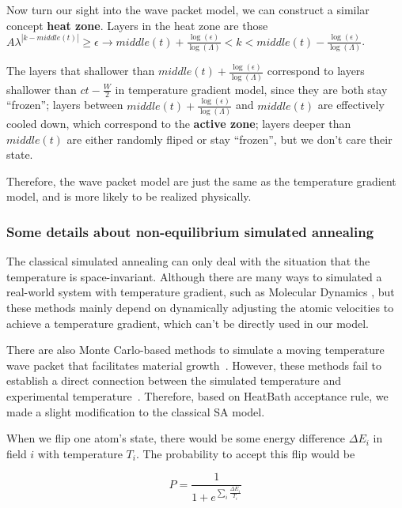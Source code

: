 \documentclass[twocolumn,superscriptaddress,english,showpacs,longbibliography]{revtex4-2}
\begin{document}
Now turn our sight into the wave packet model, we can construct a
similar concept \textbf{heat zone}. Layers in the heat zone are those
$A\lambda^{|k-middle(t)|}\ge \epsilon\rightarrow middle(t) + \frac{\log(\epsilon)}{\log(\Lambda)}< k < middle(t) - \frac{\log(\epsilon)}{\log(\Lambda)}$.

The layers that shallower than
$middle(t) + \frac{\log(\epsilon)}{\log(\Lambda)}$ correspond to
layers shallower than $ct-\frac{W}{2}$ in temperature gradient model,
since they are both stay ``frozen''; layers between
$middle(t) +\frac{\log(\epsilon)}{\log(\Lambda)}$ and $middle(t)$
are effectively cooled down, which correspond to the \textbf{active
zone}; layers deeper than $middle(t)$ are either randomly fliped or
stay ``frozen'', but we don't care their state.

Therefore, the wave packet model are just the same as the temperature
gradient model, and is more likely to be realized physically.

\subsubsection{Some details about non-equilibrium simulated
annealing}\label{some-details-about-non-equilibrium-simulated-annealing}

The classical simulated annealing can only deal with the situation that
the temperature is space-invariant. Although there are many ways to
simulated a real-world system with temperature gradient, such as
Molecular Dynamics \cite{Bai2015, Deng2006}, but
these methods mainly depend on dynamically adjusting the atomic
velocities to achieve a temperature gradient, which can't be directly
used in our model.

There are also Monte Carlo-based methods to simulate a moving
temperature wave packet that facilitates material growth~\cite{Godfrey1995, Tan2017}.
However, these methods fail to establish a direct connection between the simulated temperature and experimental
temperature~\cite{Zollner2014}.
Therefore, based on HeatBath acceptance rule, we made a slight modification to the classical SA model.

When we flip one atom's state, there would be some energy difference
$\Delta E_{i}$ in field $i$ with temperature $T_i$. The
probability to accept this flip would be

\begin{equation}
P = \frac{1}{1 + e^{\sum_i \frac{\Delta E_i}{T_i}}}
\end{equation}
\end{document}
